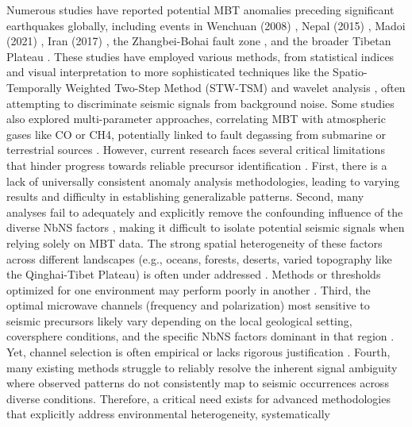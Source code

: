 \documentclass[fleqn,10pt]{wlscirep_mdpi_style}
\begin{document}
Numerous studies have reported potential MBT anomalies preceding significant earthquakes globally, including events in Wenchuan (2008) \cite{qiSpatiotemporallyWeightedTwostep2020,maTwostepMethodExtract2011,jeongDeepLearningBased2024}, Nepal (2015) \cite{qiMicrowaveBrightnessTemperature2022}, Madoi (2021) \cite{wuIdentifyingSeismicAnomalies2024}, Iran (2017) \cite{wuIdentifyingSeismicAnomalies2024}, the Zhangbei-Bohai fault zone \cite{liuGeneralFeaturesMultiparameter2023}, and the broader Tibetan Plateau \cite{guptaMicrowaveEmissionScattering2014,qiCharacteristicBackgroundMicrowave2023}. These studies have employed various methods, from statistical indices and visual interpretation \cite{takanoExperimentTheoreticalStudy2009,liuExperimentalStudyMicrowave2016} to more sophisticated techniques like the Spatio-Temporally Weighted Two-Step Method (STW-TSM) \cite{qiSpatiotemporallyWeightedTwostep2020,qiMicrowaveBrightnessTemperature2022,maTwostepMethodExtract2011} and wavelet analysis \cite{kawanishiAdvancedMicrowaveScanning2003}, often attempting to discriminate seismic signals from background noise. Some studies also explored multi-parameter approaches, correlating MBT with atmospheric gases like CO or CH4, potentially linked to fault degassing from submarine or terrestrial sources \cite{lixinProgressesPossibleFrontiers2022,liuGeneralFeaturesMultiparameter2023}. However, current research faces several critical limitations that hinder progress towards reliable precursor identification \cite{lixinProgressesPossibleFrontiers2022}. First, there is a lack of universally consistent anomaly analysis methodologies, leading to varying results and difficulty in establishing generalizable patterns. Second, many analyses fail to adequately and explicitly remove the confounding influence of the diverse NbNS factors \cite{wuGEOSSbasedThermalParameters2012,qiSpatiotemporallyWeightedTwostep2020,maedaDiscriminationLocalFaint2008,qiCharacteristicBackgroundMicrowave2023} , making it difficult to isolate potential seismic signals when relying solely on MBT data. The strong spatial heterogeneity of these factors across different landscapes (e.g., oceans, forests, deserts, varied topography like the Qinghai-Tibet Plateau) is often under addressed \cite{maedaDiscriminationLocalFaint2008,qiCharacteristicBackgroundMicrowave2023,wuIdentifyingSeismicAnomalies2024}. Methods or thresholds optimized for one environment may perform poorly in another \cite{qiCharacteristicBackgroundMicrowave2023,wuIdentifyingSeismicAnomalies2024}. Third, the optimal microwave channels (frequency and polarization) most sensitive to seismic precursors likely vary depending on the local geological setting, coversphere conditions, and the specific NbNS factors dominant in that region \cite{maedaDiscriminationLocalFaint2008,qiCharacteristicBackgroundMicrowave2023,lixinProgressesPossibleFrontiers2022}. Yet, channel selection is often empirical or lacks rigorous justification \cite{lixinProgressesPossibleFrontiers2022}. Fourth, many existing methods struggle to reliably resolve the inherent signal ambiguity where observed patterns do not consistently map to seismic occurrences across diverse conditions. Therefore, a critical need exists for advanced methodologies that explicitly address environmental heterogeneity, systematically 
\end{document}
